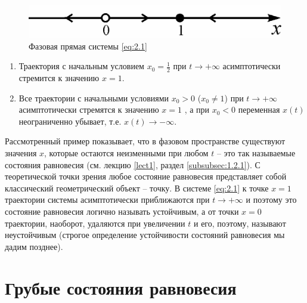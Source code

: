 \begin{figure}[h!]
	\centering
	\includegraphics[]{fig/lect2/2}
	\caption{Фазовая прямая системы \eqref{eq:2.1}}
	\label{fig:2.2}
\end{figure}





\begin{enumerate}
	\item Траектория с начальным условием $x_0=\frac12$ при $t \rightarrow + \infty$ асимптотически стремится к значению $x=1$.
	\item Все траектории с начальными условиями $x_0>0$ ($x_0\neq1$) при $t \rightarrow + \infty$ асимптотически стремятся к значению $x=1$ , а при $x_0<0$ переменная $x(t)$ неограниченно убывает, т.е. $x(t) \rightarrow - \infty$. 
\end{enumerate}

Рассмотренный пример показывает, что в фазовом пространстве существуют значения $x$, которые остаются неизменными при любом $t$ -- это так называемые состояния равновесия (см. лекцию \ref{lect1}, раздел \ref{subsubsec:1.2.1}). С теоретической точки зрения любое состояние равновесия представляет собой классический геометрический объект -- точку. В системе \eqref{eq:2.1} к точке $x=1$ траектории системы асимптотически приближаются при $t \rightarrow + \infty$ и поэтому это состояние равновесия логично называть устойчивым, а от точки $x=0$ траектории, наоборот, удаляются при увеличении $t$ и его, поэтому, называют неустойчивым (строгое определение устойчивости состояний равновесия мы дадим позднее).


\section{Грубые состояния равновесия} %
\label{subsec:2.2}


